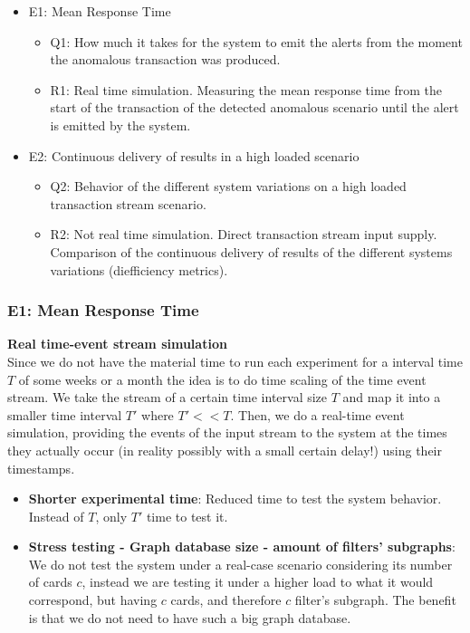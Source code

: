 \begin{itemize}
\item{E1: Mean Response Time}

\begin{itemize}
  \item Q1: How much it takes for the system to emit the alerts from the moment the anomalous transaction was produced.
  \item R1: Real time simulation. Measuring the mean response time from the start of the transaction of the detected anomalous scenario until the alert is emitted by the system.
\end{itemize}

\item{E2: Continuous delivery of results in a high loaded scenario}

\begin{itemize}
  \item Q2: Behavior of the different system variations on a high loaded transaction stream scenario.
  \item R2: Not real time simulation. Direct transaction stream input supply. Comparison of the continuous delivery of results of the different systems variations (diefficiency metrics).
\end{itemize}
\end{itemize}

\subsubsection{E1: Mean Response Time}

\textbf{Real time-event stream simulation\\}
Since we do not have the material time to run each experiment for a interval time $T$ of some weeks or a month the idea is to do time scaling of the time event stream. We take the stream of a certain time interval size $T$ and map it into a smaller time interval
$T'$ where $T' << T$. Then, we do a real-time event simulation, providing the events of the input stream to the system at the times they actually occur (in reality possibly with a small certain delay!) using their timestamps.

\begin{itemize}
  \item \textbf{Shorter experimental time}: Reduced time to test the system behavior. Instead of $T$, only $T'$ time to test it. 
  \item \textbf{Stress testing - Graph database size - amount of filters' subgraphs}: We do not test the system under a real-case scenario considering its number of cards $c$, instead we are testing it under a higher load to what it would correspond, but having $c$ cards, and therefore $c$ filter's subgraph. The benefit is that we do not need to have such a big graph database.
\end{itemize}

